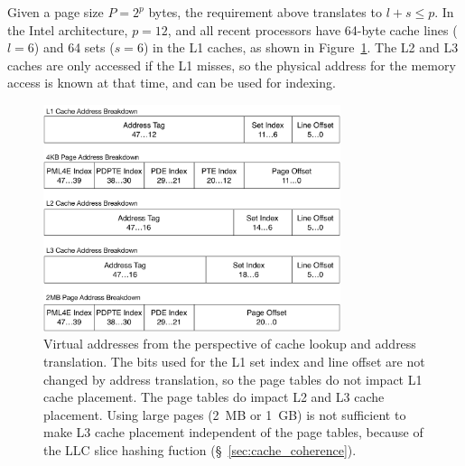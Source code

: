 Given a page size $P = 2^{p}$ bytes, the requirement above translates to
$l + s \le p$. In the Intel architecture, $p = 12$, and all recent processors
have 64-byte cache lines ($l = 6$) and 64 sets ($s = 6$) in the L1 caches, as
shown in Figure~\ref{fig:caching_and_paging}. The L2 and L3 caches are only
accessed if the L1 misses, so the physical address for the memory access is
known at that time, and can be used for indexing.

\begin{figure}[hbt]
  \centering
  \includegraphics[width=87mm]{figures/caching_and_paging.pdf}
  \caption{
    Virtual addresses from the perspective of cache lookup and address
    translation. The bits used for the L1 set index and line offset are not
    changed by address translation, so the page tables do not impact L1 cache
    placement. The page tables do impact L2 and L3 cache placement. Using large
    pages (2~MB or 1~GB) is not sufficient to make L3 cache placement
    independent of the page tables, because of the LLC slice hashing fuction
    (\S~\ref{sec:cache_coherence}).
  }
  \label{fig:caching_and_paging}
\end{figure}
